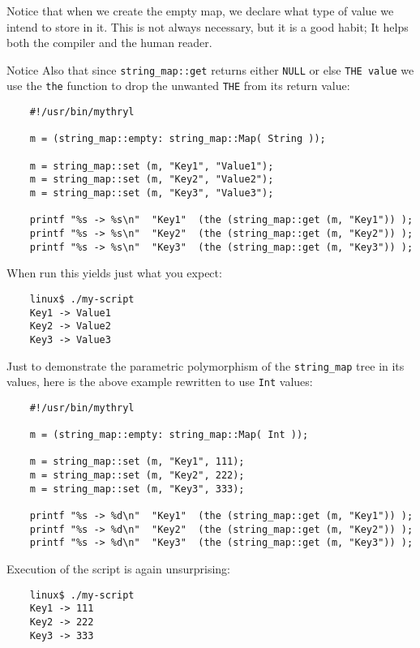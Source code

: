 Notice that when we create the empty 
map, we declare what type of value we intend to store in it.  This is not 
always necessary, but it is a good habit;  It helps both the compiler and 
the human reader.

Notice Also that since 
{\tt string\_map::get} returns either {\tt NULL} or else {\tt THE value} we use the 
{\tt the} function to drop the unwanted {\tt THE} from its return value:

\begin{verbatim}
    #!/usr/bin/mythryl

    m = (string_map::empty: string_map::Map( String ));

    m = string_map::set (m, "Key1", "Value1");
    m = string_map::set (m, "Key2", "Value2");
    m = string_map::set (m, "Key3", "Value3");

    printf "%s -> %s\n"  "Key1"  (the (string_map::get (m, "Key1")) );
    printf "%s -> %s\n"  "Key2"  (the (string_map::get (m, "Key2")) );
    printf "%s -> %s\n"  "Key3"  (the (string_map::get (m, "Key3")) );
\end{verbatim}

When run this yields just what you expect:
 
\begin{verbatim}
    linux$ ./my-script
    Key1 -> Value1
    Key2 -> Value2
    Key3 -> Value3
\end{verbatim}

Just to demonstrate the parametric polymorphism of the {\tt string\_map} tree 
in its values, here is the above example rewritten to use {\tt Int} values:

\begin{verbatim}
    #!/usr/bin/mythryl

    m = (string_map::empty: string_map::Map( Int ));

    m = string_map::set (m, "Key1", 111);
    m = string_map::set (m, "Key2", 222);
    m = string_map::set (m, "Key3", 333);

    printf "%s -> %d\n"  "Key1"  (the (string_map::get (m, "Key1")) );
    printf "%s -> %d\n"  "Key2"  (the (string_map::get (m, "Key2")) );
    printf "%s -> %d\n"  "Key3"  (the (string_map::get (m, "Key3")) );
\end{verbatim}

Execution of the script is again unsurprising:

\begin{verbatim}
    linux$ ./my-script
    Key1 -> 111
    Key2 -> 222
    Key3 -> 333
\end{verbatim}

